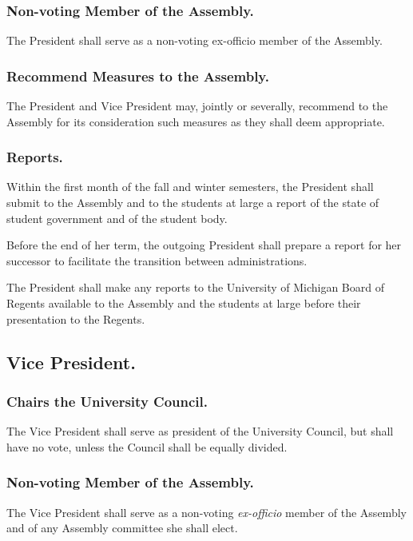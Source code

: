 \subsubsection{Non-voting Member of the Assembly.}
The President shall serve as a non-voting ex-officio member of the Assembly.

\subsubsection{Recommend Measures to the Assembly.}
The President and Vice President may, jointly or severally, recommend to the Assembly for its consideration such measures as they shall deem appropriate.

\subsubsection{Reports.}

Within the first month of the fall and winter semesters, the President shall submit to the Assembly and to the students at large a report of the state of student government and of the student body.

Before the end of her term, the outgoing President shall prepare a report for her successor to facilitate the transition between administrations.

The President shall make any reports to the University of Michigan Board of Regents available to the Assembly and the students at large before their presentation to the Regents.


\subsection{Vice President.}
\subsubsection{Chairs the University Council.}
The Vice President shall serve as president of the University Council, but shall have no vote, unless the Council shall be equally divided.

\subsubsection{Non-voting Member of the Assembly.}
The Vice President shall serve as a non-voting \textit{ex-officio} member of the Assembly and of any Assembly committee she shall elect.

